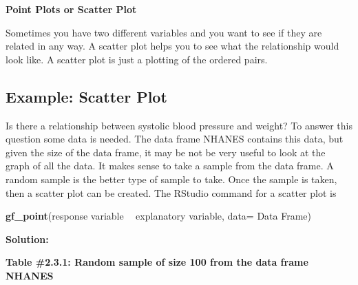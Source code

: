 \documentclass[
]{book}
\newenvironment{Shaded}{\begin{snugshade}}{\end{snugshade}}
\newcommand{\DataTypeTok}[1]{\textcolor[rgb]{0.13,0.29,0.53}{#1}}
\newcommand{\DecValTok}[1]{\textcolor[rgb]{0.00,0.00,0.81}{#1}}
\newcommand{\KeywordTok}[1]{\textcolor[rgb]{0.13,0.29,0.53}{\textbf{#1}}}
\newcommand{\NormalTok}[1]{#1}
\newcommand{\OperatorTok}[1]{\textcolor[rgb]{0.81,0.36,0.00}{\textbf{#1}}}
\newcommand{\StringTok}[1]{\textcolor[rgb]{0.31,0.60,0.02}{#1}}
\begin{document}
\textbf{Point Plots or Scatter Plot}

Sometimes you have two different variables and you want to see if they are related in any way. A scatter plot helps you to see what the relationship would look like. A scatter plot is just a plotting of the
ordered pairs.

\hypertarget{example-scatter-plot}{%
\subsection{\texorpdfstring{Example: \textbf{Scatter Plot}}{Example: Scatter Plot}}\label{example-scatter-plot}}

Is there a relationship between systolic blood pressure and weight? To answer this question some data is needed. The data frame NHANES contains this data, but given the size of the data frame, it may be not be very useful to look at the graph of all the data. It makes sense to take a sample from the data frame. A random sample is the better type of sample to take. Once the sample is taken, then a scatter plot can be created. The RStudio command for a scatter plot is

\begin{Shaded}
\begin{Highlighting}[]
\KeywordTok{gf_point}\NormalTok{(response variable }\OperatorTok{~}\StringTok{ }\NormalTok{explanatory variable, }\DataTypeTok{data=}\NormalTok{ Data Frame)}
\end{Highlighting}
\end{Shaded}

\textbf{Solution:}

\textbf{Table \#2.3.1: Random sample of size 100 from the data frame NHANES}

\begin{Shaded}
\end{Shaded}
\end{document}
